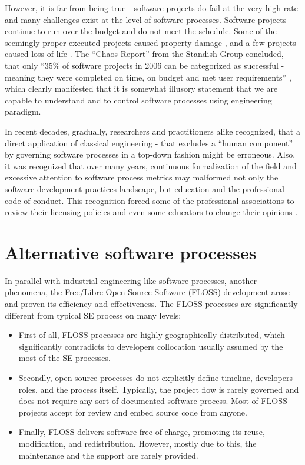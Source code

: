 However, it is far from being true - software projects do fail at the very high rate and many challenges 
exist at the level of software processes. Software projects continue to run over the budget and do not 
meet the schedule. Some of the seemingly proper executed projects caused property 
damage \cite{citeulike:11044022}, and a few projects caused loss of life \cite{citeulike:712058}. 
The ``Chaos Report'' from the Standish Group concluded, that only ``35\% of software projects in 2006 
can be categorized as successful - meaning they were completed on time, on budget and met 
user requirements'' \cite{chaos2006}, which clearly manifested that it is somewhat illusory statement 
that we are capable to understand and to control software processes using engineering paradigm.

In recent decades, gradually, researchers and practitioners alike recognized, that a direct application 
of classical engineering - that excludes a ``human component'' by governing software processes 
in a top-down fashion might be erroneous. 
Also, it was recognized that over many years, continuous formalization of the field and 
excessive attention to software process metrics may malformed not only the software development 
practices landscape, but education and the professional code of conduct. 
This recognition forced some of the professional associations to review their licensing policies 
\cite{citeulike:11045517} and even some educators to change their opinions \cite{citeulike:5203446}. 

\section{Alternative software processes}
In parallel with industrial engineering-like software processes, another phenomena, the Free/Libre Open 
Source Software (FLOSS) development arose and proven its efficiency and effectiveness.
The FLOSS processes are significantly different from typical SE process on many levels:
\begin{itemize}
 \item First of all, FLOSS processes are highly geographically distributed, which significantly contradicts 
 to developers collocation usually assumed by the most of the SE processes. 
 \item Secondly, open-source processes do not explicitly define timeline, developers roles, and 
 the process itself. Typically, the project flow is rarely governed and does not require any sort of 
 documented software process. Most of FLOSS projects accept for review and embed source code from anyone.
 \item Finally, FLOSS delivers software free of charge, promoting its reuse, modification, and redistribution.
 However, mostly due to this, the maintenance and the support are rarely provided.
\end{itemize}

